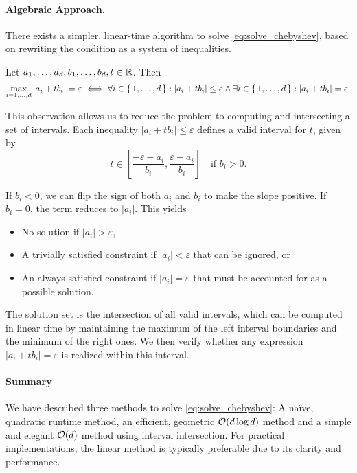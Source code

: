 \paragraph{Algebraic Approach.}
There exists a simpler, linear-time algorithm to solve \cref{eq:solve_chebyshev}, based on rewriting the condition as a system of inequalities.

\begin{observation}
	Let \(a_1, \dots, a_d, b_1, \dots, b_d, t \in \mathbb{R}\). Then
	\[\max_{i=1,\dots, d} |a_i + tb_i| = \varepsilon \iff \forall i \in \set{1,\dots, d}:  |a_i + tb_i| \leq \varepsilon \land \exists i \in \set{1,\dots, d}: |a_i + tb_i| = \varepsilon.\]
\end{observation}

This observation allows us to reduce the problem to computing and intersecting a set of intervals. Each inequality \(|a_i + tb_i| \leq \varepsilon\) defines a valid interval for \(t\), given by 
	\[t \in \left[\frac{-\varepsilon - a_i}{b_i}, \frac{\varepsilon - a_i}{b_i}\right] \quad \text{if } b_i > 0.\]

If \(b_i < 0\), we can flip the sign of both \(a_i\) and \(b_i\) to make the slope positive. If \(b_i = 0\), the term reduces to \(|a_i|\). This yields
\begin{itemize}
	\item No solution if \(|a_i| > \varepsilon\),
	\item A trivially satisfied constraint if \(|a_i| < \varepsilon\) that can be ignored, or 
	\item An always-satisfied constraint if \(|a_i| = \varepsilon\) that must be accounted for as a possible solution.
\end{itemize}

The solution set is the intersection of all valid intervals, which can be computed in linear time by maintaining the maximum of the left interval boundaries and the minimum of the right ones. We then verify whether any expression \(|a_i + tb_i| = \varepsilon\) is realized within this interval.

\paragraph{Summary}
We have described three methods to solve \cref{eq:solve_chebyshev}: A na\"ive, quadratic runtime method, an efficient, geometric \(\mathcal{O}(d\log d)\) method and a simple and elegant \(\mathcal{O}(d)\) method using interval intersection. For practical implementations, the linear method is typically preferable due to its clarity and performance.



